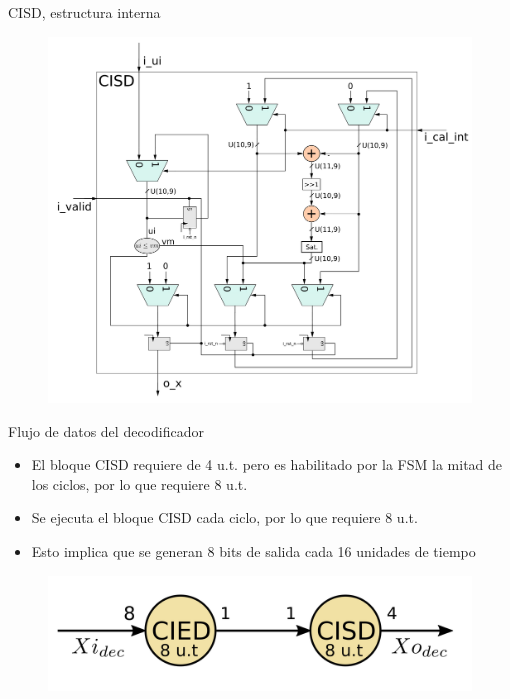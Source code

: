 \documentclass[xcolor=table]{beamer}
\begin{document}
\begin{frame}{CISD, estructura interna}

 \begin{figure}
  \centering
  \includegraphics[width=0.70\paperwidth]{Diagramas/internal_cisd.png}%
\end{figure}
\end{frame}

\begin{frame}{Flujo de datos del decodificador}
    \begin{itemize}
        \item El bloque CISD requiere de 4 u.t. pero es habilitado por la FSM la mitad de los ciclos, por lo que requiere 8 u.t.
        \item Se ejecuta el bloque CISD cada ciclo, por lo que requiere 8 u.t.
        \item Esto implica que se generan 8 bits de salida cada 16 unidades de tiempo
    \end{itemize}
 \begin{figure}
  \centering
  \includegraphics[width=0.70\paperwidth]{Diagramas/grafo_dec.png}%
\end{figure}
\end{frame}
\end{document}
